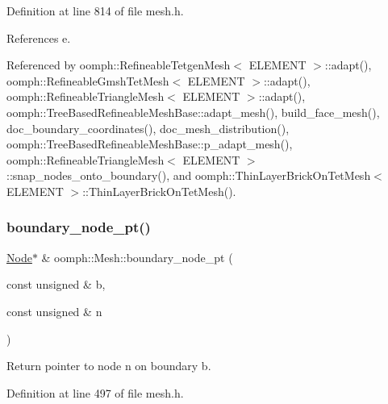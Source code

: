 Definition at line 814 of file mesh.\+h.



References e.



Referenced by oomph\+::\+Refineable\+Tetgen\+Mesh$<$ E\+L\+E\+M\+E\+N\+T $>$\+::adapt(), oomph\+::\+Refineable\+Gmsh\+Tet\+Mesh$<$ E\+L\+E\+M\+E\+N\+T $>$\+::adapt(), oomph\+::\+Refineable\+Triangle\+Mesh$<$ E\+L\+E\+M\+E\+N\+T $>$\+::adapt(), oomph\+::\+Tree\+Based\+Refineable\+Mesh\+Base\+::adapt\+\_\+mesh(), build\+\_\+face\+\_\+mesh(), doc\+\_\+boundary\+\_\+coordinates(), doc\+\_\+mesh\+\_\+distribution(), oomph\+::\+Tree\+Based\+Refineable\+Mesh\+Base\+::p\+\_\+adapt\+\_\+mesh(), oomph\+::\+Refineable\+Triangle\+Mesh$<$ E\+L\+E\+M\+E\+N\+T $>$\+::snap\+\_\+nodes\+\_\+onto\+\_\+boundary(), and oomph\+::\+Thin\+Layer\+Brick\+On\+Tet\+Mesh$<$ E\+L\+E\+M\+E\+N\+T $>$\+::\+Thin\+Layer\+Brick\+On\+Tet\+Mesh().

\mbox{\label{classoomph_1_1Mesh_a2e637d80f84092d1d6977a827fceeca5}} 
\subsubsection{\texorpdfstring{boundary\+\_\+node\+\_\+pt()}{boundary\_node\_pt()}\hspace{0.1cm}{\footnotesize\ttfamily [1/2]}}
{\footnotesize\ttfamily \hyperlink{classoomph_1_1Node}{Node}$\ast$ \& oomph\+::\+Mesh\+::boundary\+\_\+node\+\_\+pt (\begin{DoxyParamCaption}\item[{const unsigned \&}]{b,  }\item[{const unsigned \&}]{n }\end{DoxyParamCaption})\hspace{0.3cm}{\ttfamily [inline]}}



Return pointer to node n on boundary b. 



Definition at line 497 of file mesh.\+h.



